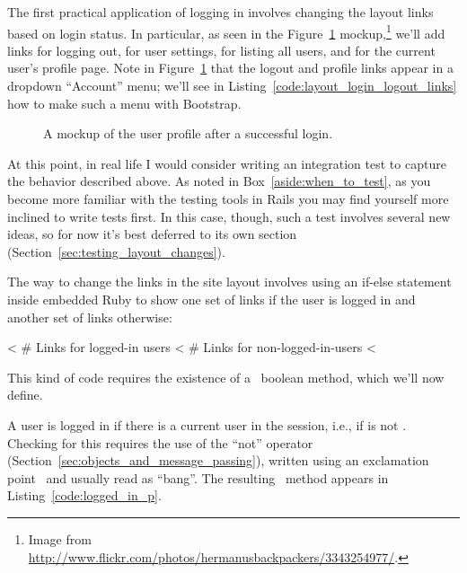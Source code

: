 The first practical application of logging in involves changing the layout links based on login status. In particular, as seen in the Figure~\ref{fig:login_success_mockup} mockup,\footnote{Image from \href{http://www.flickr.com/photos/hermanusbackpackers/3343254977/}{http://www.flickr.com/photos/hermanusbackpackers/3343254977/}.} we'll add links for logging out, for user settings, for listing all users, and for the current user's profile page. Note in Figure~\ref{fig:login_success_mockup} that the logout and profile links appear in a dropdown ``Account'' menu; we'll see in Listing~\ref{code:layout_login_logout_links} how to make such a menu with Bootstrap.

\begin{figure}
\begin{center}
\end{center}
\caption{A mockup of the user profile after a successful login.\label{fig:login_success_mockup}}
\end{figure}

At this point, in real life I would consider writing an integration test to capture the behavior described above. As noted in Box~\ref{aside:when_to_test}, as you become more familiar with the testing tools in Rails you may find yourself more inclined to write tests first. In this case, though, such a test involves several new ideas, so for now it's best deferred to its own section (Section~\ref{sec:testing_layout_changes}).

The way to change the links in the site layout involves using an
if-else statement inside embedded Ruby to show one set of links if the user is logged in and another set of links otherwise:

\begin{code}
<%
  # Links for logged-in users
<%
  # Links for non-logged-in-users
<%
\end{code}

\noindent This kind of code requires the existence of a \ boolean method, which we'll now define.

A user is logged in if there is a current user in the session, i.e., if \linebreak {} is not . Checking for this requires the use of the ``not'' operator (Section~\ref{sec:objects_and_message_passing}), written using an exclamation point~\kode{!} and usually read as ``bang''. The resulting \ method appears in Listing~\ref{code:logged_in_p}.


